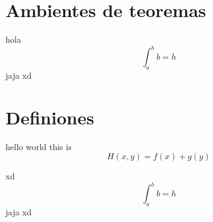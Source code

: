 \section{Ambientes de teoremas}

\lipsum[1]

\begin{theorem}
    hola \[\int_a^b b = h\]
    jaja xd
\end{theorem}


\section{Definiones}

\begin{definition}
    hello world this is \[
        H(x,y)  = f(x) + g(y)\]
\end{definition}


\lipsum[0]

\begin{theorem}
    xd \lipsum[1] \[\int_a^b b = h\]
    jaja xd
\end{theorem}



